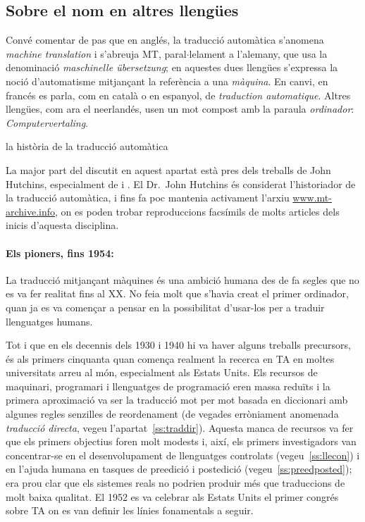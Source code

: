 \subsection{Sobre el nom en altres llengües}

Convé comentar de pas que en anglés, la traducció automàtica s'anomena
\emph{machine translation} i s'abreuja MT, paral$\cdot$lelament a
l'alemany, que usa la denominació \emph{maschinelle übersetzung}; en
aquestes dues llengües s'expressa la noció d'automatisme mitjançant la
referència a una {\em màquina}. En canvi, en francés es parla, com en
català o en espanyol, de {\em traduction automatique}. Altres
llengües, com ara el neerlandés, usen un mot compost amb la paraula
\emph{ordinador}: \emph{Computervertaling}.

\begin{persabermes}{la història de la traducció automàtica}

  La major part del discutit en aquest apartat està pres dels treballs
  de John Hutchins, especialment de \cite{hutchins1995} i
  \cite{hutchins2001}. El Dr.\ John Hutchins és considerat
  l'historiador de la traducció automàtica, i fins fa poc mantenia
  activament l'arxiu \url{www.mt-archive.info}, on es poden trobar
  reproduccions facsímils de molts articles dels inicis d'aquesta
  disciplina.

\paragraph{Els pioners, fins 1954:} La traducció mitjançant màquines
és una ambició humana des de fa segles que no es va fer realitat fins
al XX. No feia molt que s'havia creat el primer ordinador, quan ja es
va començar a pensar en la possibilitat d'usar-los per a traduir
llenguatges humans.

Tot i que en els decennis dels 1930 i 1940 hi va haver alguns treballs
precursors, és als primers cinquanta quan comença realment la recerca
en TA en moltes universitats arreu al món, especialment als Estats
Units. Els recursos de maquinari, programari i llenguatges de
programació eren massa reduïts i la primera aproximació va ser la
traducció mot per mot basada en diccionari amb algunes regles
senzilles de reordenament (de vegades erròniament anomenada
\emph{traducció directa}, vegeu l'apartat~\ref{ss:traddir}). Aquesta
manca de recursos va fer que els primers objectius foren molt modests
i, així, els primers investigadors van concentrar-se en el
desenvolupament de llenguatges controlats (vegeu~\ref{ss:llecon}) i en
l'ajuda humana en tasques de preedició i postedició
(vegeu~\ref{ss:preedposted}); era prou clar que els sistemes reals no
podrien produir més que traduccions de molt baixa qualitat.  El 1952
es va celebrar als Estats Units el primer congrés sobre TA on es van
definir les línies fonamentals a seguir.


\end{persabermes}
